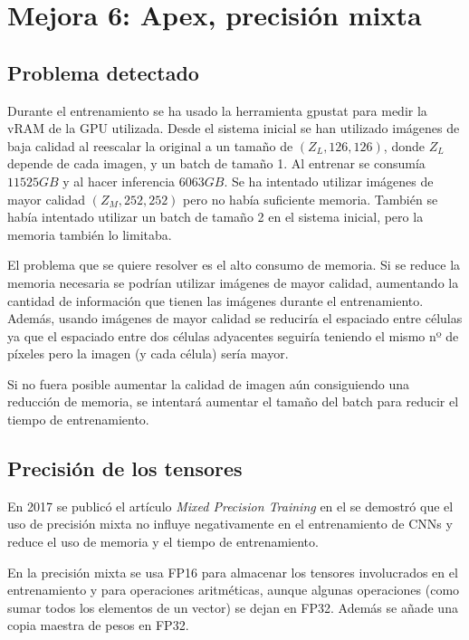 \chapter{Mejora 6: Apex, precisión mixta}\label{apex}

\section{Problema detectado}\label{sec:apex_problem}

Durante el entrenamiento se ha usado la herramienta gpustat \cite{wookayin} para medir la vRAM de la GPU utilizada. Desde el sistema inicial se han utilizado imágenes de baja calidad al reescalar la original a un tamaño de $(Z_L, 126, 126)$, donde $Z_L$ depende de cada imagen, y un batch de tamaño 1. Al entrenar se consumía $11525GB$ y al hacer inferencia $6063GB$. Se ha intentado utilizar imágenes de mayor calidad $(Z_M, 252, 252)$ pero no había suficiente memoria. También se había intentado utilizar un batch de tamaño 2 en el sistema inicial, pero la memoria también lo limitaba.

El problema que se quiere resolver es el alto consumo de memoria. Si se reduce la memoria necesaria se podrían utilizar imágenes de mayor calidad, aumentando la cantidad de información que tienen las imágenes durante el entrenamiento. Además, usando imágenes de mayor calidad se reduciría el espaciado entre células ya que el espaciado entre dos células adyacentes seguiría teniendo el mismo nº de píxeles pero la imagen (y cada célula) sería mayor.

Si no fuera posible aumentar la calidad de imagen aún consiguiendo una reducción de memoria, se intentará aumentar el tamaño del batch para reducir el tiempo de entrenamiento.

\section{Precisión de los tensores}\label{sec:apex_precision}

En 2017 se publicó el artículo \textit{Mixed Precision Training} en el se demostró que el uso de precisión mixta no influye negativamente en el entrenamiento de CNNs \cite{Micikevicius2018} y reduce el uso de memoria y el tiempo de entrenamiento.

En la precisión mixta se usa FP16 para almacenar los tensores involucrados en el entrenamiento y para operaciones aritméticas, aunque algunas operaciones (como sumar todos los elementos de un vector) se dejan en FP32. Además se añade una copia maestra de pesos en FP32.

